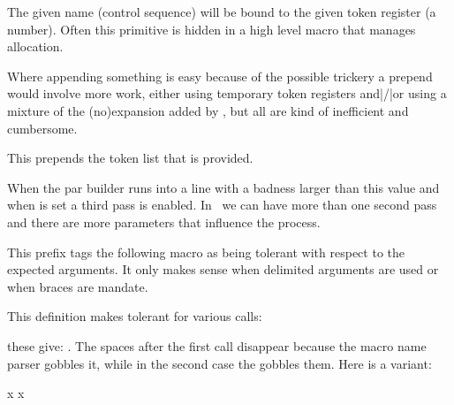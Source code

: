 \stopnewprimitive

\startoldprimitive[title={\prm {toksdef}}]

The given name (control sequence) will be bound to the given token register (a
number). Often this primitive is hidden in a high level macro that manages
allocation.

\stopoldprimitive

\startnewprimitive[title={\prm {tokspre}}]

Where appending something is easy because of the possible 
trickery a prepend would involve more work, either using temporary token
registers and|/|or using a mixture of the (no)expansion added by \ETEX, but all
are kind of inefficient and cumbersome.

\starttyping
\tokspre{}
\tokspre\scratchtoksone\scratchtokstwo
\stoptyping

This prepends the token list that is provided.

\stopnewprimitive

\startoldprimitive[title={\prm {tolerance}}]

When the par builder runs into a line with a badness larger than this value and
when  is set a third pass is enabled. In \LUAMETATEX\ we
can have more than one second pass and there are more parameters that influence
the process.

\stopoldprimitive

\startnewprimitive[title={\prm {tolerant}}]

This prefix tags the following macro as being tolerant with respect to the
expected arguments. It only makes sense when delimited arguments are used or when
braces are mandate.

\startbuffer
\tolerant{}
\stopbuffer

\typebuffer \getbuffer

This definition makes \type {\foo} tolerant for various calls:

\startbuffer
\foo \foo[1] \foo [1] \foo[1] [2] \foo [1] [2]
\stopbuffer

\typebuffer

these give: \inlinebuffer. The spaces after the first call disappear because the
macro name parser gobbles it, while in the second case the \type {#*} gobbles
them. Here is a variant:

\startbuffer
\tolerant{}

\foo[?] x
\foo[?] [?] x

